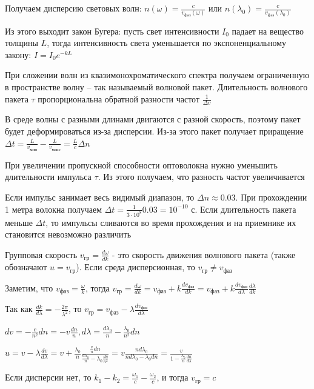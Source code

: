 Получаем дисперсию световых волн: $n(\omega) = \frac{c}{v_{фаз}(\omega)}$ или $n(\lambda_0) = \frac{c}{v_{фаз}(\lambda_0)}$

Из этого выходит закон Бугера: пусть свет интенсивности $I_0$ падает на вещество толщины $L$, тогда интенсивность света уменьшается по экспоненциальному закону: $I = I_0 e^{- k L}$

При сложении волн из квазимонохроматического спектра получаем ограниченную в пространстве волну -- так называемый волновой пакет. Длительность волнового пакета $\tau$ пропорциональна обратной разности частот $\frac{1}{\Delta v}$

В среде волны с разными длинами двигаются с разной скорость, поэтому пакет будет деформироваться из-за дисперсии. Из-за этого пакет получает приращение $\Delta t = \frac{L}{v_{мин}} - \frac{L}{v_{макс}} = \frac{L}{c} \Delta n$

При увеличении пропускной способности оптоволокна нужно уменьшить длительности импульса $\tau$. Из этого получаем, что разность частот увеличивается

Если импульс занимает весь видимый диапазон, то $\Delta n \approx 0.03$. При прохождении 1 метра волокна получаем $\Delta t = \frac{1}{3 \cdot 10^8} 0.03 = 10^{-10}$ с. Если длительность пакета меньше $\Delta t$, то импульсы сливаются во время прохождения и на приемнике их становится невозможно различить 

Групповая скорость $v_{\text{гр}} = \frac{d\omega}{dk}$ - это скорость движения волнового пакета (также обозначают $u = v_\text{гр}$). Если среда дисперсионная, то $v_{\text{гр}} \neq v_{\text{фаз}}$

Заметим, что $v_{\text{фаз}} = \frac{\omega}{k}$, тогда $v_{\text{гр}} = \frac{d\omega}{dk} = v_{\text{фаз}} + k \frac{d v_{\text{фаз}}}{dk} = v_{\text{фаз}} + k \frac{d v_{\text{фаз}}}{d\lambda} \frac{d\lambda}{dk}$

Так как $\frac{dk}{d\lambda} = -\frac{2\pi}{\lambda^2}$, то $v_{\text{гр}} = v_{\text{фаз}} - \lambda \frac{d v_{\text{фаз}}}{d\lambda}$

$dv = - \frac{c}{n^2} dn = -v \frac{dn}{n}, d\lambda = \frac{d \lambda_0}{n} - \frac{\lambda_0}{n^2} dn$

$u = v - \lambda \frac{dv}{d\lambda} = v + \frac{\lambda_0}{n} \frac{\frac{v}{n} dn}{\frac{d \lambda_0}{n} - \lambda_0 \frac{dn}{n^2}} = v \frac{n d\lambda_0}{n d\lambda_0 - \lambda_0 dn} = \frac{v}{1 - \frac{\lambda_0}{n} \frac{dn}{d\lambda}}$

Если дисперсии нет, то $k_1 - k_2 = \frac{\omega_1}{c} - \frac{\omega_2}{c}$, и тогда $v_{\text{гр}} = c$


